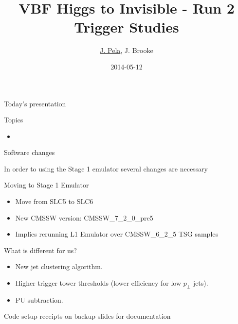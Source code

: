 \documentclass[8pt]{beamer}
\author[J. Pela]{\underline{J. Pela}, J. Brooke}
\title{VBF Higgs to Invisible - Run 2 Trigger Studies}
\institute[ICL]{Imperial College London}
\date{2014-05-12}
\begin{document}
\setlength{\unitlength}{1mm}

\begin{frame}
  \titlepage
\end{frame}

\begin{frame}{Today's presentation}
 
\begin{block}{Topics}
 
\begin{itemize}
  \item 
\end{itemize}

\end{block}

\end{frame}

\begin{frame}{Software changes}
 
In order to using the Stage 1 emulator several changes are necessary
 
\begin{block}{Moving to Stage 1 Emulator}
 
\begin{itemize}
  \item Move from SLC5 to SLC6
  \item New CMSSW version: CMSSW\_7\_2\_0\_pre5 
  \item Implies rerunning L1 Emulator over CMSSW\_6\_2\_5 TSG samples
\end{itemize}

\end{block}

\begin{block}{What is different for us?}
 
\begin{itemize}
  \item New jet clustering algorithm.
  \item Higher trigger tower thresholds (lower efficiency for low $p_\perp$ jets).
  \item PU subtraction.
\end{itemize}

\end{block}

Code setup receipts on backup slides for documentation

\end{frame}
\end{document}
